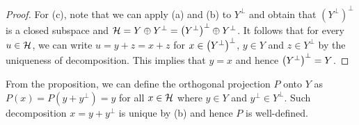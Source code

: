 \begin{proof}
    For (c), note that we can apply (a) and (b) to $Y^\perp$ and obtain that 
    $(Y^\perp)^\perp$ is a closed subspace and $\H = Y\oplus Y^\perp 
    = \pth{Y^\perp}^\perp\oplus Y^\perp$. It follows that for every $u\in\mathcal{H}$, 
    we can write $u = y + z = x + z$ for $x\in \pth{Y^\perp}^\perp$, 
    $y\in Y$ and $z\in Y^\perp$ by the uniqueness of decomposition. This 
    implies that $y = x$ and hence $\pth{Y^\perp}^\perp = Y$.
\end{proof}
\begin{remark}
    From the proposition, we can define the orthogonal 
    projection $P$ onto $Y$ as $P(x) = P(y + y^\perp) = y$ for 
    all $x\in\mathcal{H}$ where $y\in Y$ and $y^\perp\in Y^\perp$. Such 
    decomposition $x = y + y^\perp$ is unique by (b) and hence 
    $P$ is well-defined.
\end{remark}
